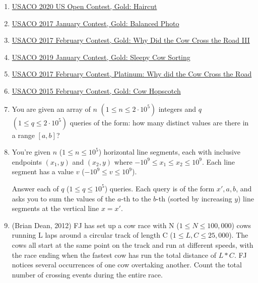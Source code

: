 \documentclass{article}
\begin{document}
\begin{enumerate}
    \item \href{http://www.usaco.org/index.php?page=viewproblem2&cpid=1041}{USACO 2020 US Open Contest, Gold: Haircut}

    \item \href{http://www.usaco.org/index.php?page=viewproblem2&cpid=693}{USACO 2017 January Contest, Gold: Balanced Photo}
    
    \item \href{http://www.usaco.org/index.php?page=viewproblem2&cpid=719}{USACO 2017 February Contest, Gold: Why Did the Cow Cross the Road III}
    
    \item \href{http://www.usaco.org/index.php?page=viewproblem2&cpid=898}{USACO 2019 January Contest, Gold: Sleepy Cow Sorting}
    
    \item \href{http://www.usaco.org/index.php?page=viewproblem2&cpid=720}{USACO 2017 February Contest, Platinum: Why did the Cow Cross the Road}
    
    \item \href{http://www.usaco.org/index.php?page=viewproblem2&cpid=532}{USACO 2015 February Contest, Gold: Cow Hopscotch}
    
    \item You are given an array of $n$ $(1 \leq n \leq 2 \cdot 10^5)$ integers and $q$ $(1 \leq q \leq 2 \cdot 10^5)$ queries of the form: how many distinct values are there in a range $[a,b]$?
    \item You're given $n$ ($1 \leq n \leq 10^5$) horizontal line segments, each with inclusive endpoints $(x_1, y)$ and $(x_2, y)$ where $-10^9 \leq x_1 \leq x_2 \leq 10^9$. Each line segment has a value $v$ ($-10^9 \leq v \leq 10^9$).

Answer each of $q$ ($1 \leq q \leq 10^5$) queries.
Each query is of the form $x', a, b$, and asks you to sum the values of the $a$-th to the $b$-th (sorted by increasing $y$) line segments at the vertical line $x = x'$.

    \item (Brian Dean, 2012) FJ has set up a cow race with N ($1 \leq N \leq 100,000$) cows running L laps around a circular
track of length C ($1 \leq L, C \leq 25,000$). The cows all start at the same point on the track and run at different
speeds, with the race ending when the fastest cow has run the total distance of $L * C$. FJ notices several
occurrences of one cow overtaking another. Count the total number of crossing events during the entire race.


\end{enumerate}
\end{document}

